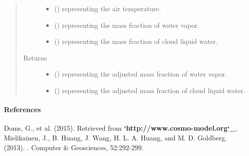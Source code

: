 \documentclass[letterpaper,10pt,english]{sphinxmanual}
\begin{document}
\begin{fulllineitems}
\begin{fulllineitems}
\begin{quote}
\begin{description}
\begin{itemize}
\item {} 
 () \textendash{}  representing the air temperature.

\item {} 
 () \textendash{}  representing the mass fraction of water vapor.

\item {} 
 () \textendash{}  representing the mass fraction of cloud liquid water.

\end{itemize}

\item[{Returns}] \leavevmode
\begin{itemize}
\item {} 
 () \textendash{}  representing the adjusted mass fraction of water vapor.

\item {} 
 () \textendash{}  representing the adjusted mass fraction of cloud liquid water.

\end{itemize}


\end{description}\end{quote}
\paragraph{References}

Doms, G., et al. (2015).  Retrieved from {\color{red}\bfseries{}{}`http://www.cosmo-model.org{}`\_}.              Mielikainen, J., B. Huang, J. Wang, H. L. A. Huang, and M. D. Goldberg. (2013).                         . Computer \& Geosciences, 52:292-299.

\end{fulllineitems}



\end{fulllineitems}
\end{document}
